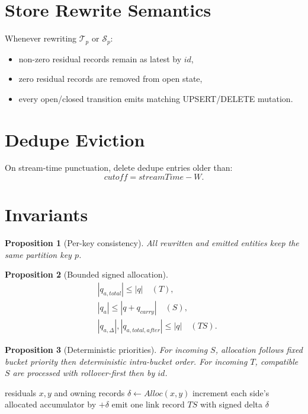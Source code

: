 \documentclass[sigconf]{acmart}
\newtheorem{proposition}{Proposition}
\begin{document}
\section{Store Rewrite Semantics}
Whenever rewriting $\mathcal{T}_p$ or $\mathcal{S}_p$:
\begin{itemize}[leftmargin=*]
  \item non-zero residual records remain as latest by $id$,
  \item zero residual records are removed from open state,
  \item every open/closed transition emits matching UPSERT/DELETE mutation.
\end{itemize}

\section{Dedupe Eviction}
On stream-time punctuation, delete dedupe entries older than:
\[
cutoff=streamTime-W.
\]

\section{Invariants}
\begin{proposition}[Per-key consistency]
All rewritten and emitted entities keep the same partition key $p$.
\end{proposition}

\begin{proposition}[Bounded signed allocation]
\[
\begin{aligned}
&|q_{a,total}|\le |q| \quad (T),\\
&|q_a|\le |q+q_{carry}| \quad (S),\\
&|q_{a,\Delta}|,|q_{a,total,after}|\le |q| \quad (TS).
\end{aligned}
\]
\end{proposition}

\begin{proposition}[Deterministic priorities]
For incoming $S$, allocation follows fixed bucket priority then deterministic intra-bucket order.
For incoming $T$, compatible $S$ are processed with rollover-first then by $id$.
\end{proposition}

\begin{algorithm}[t]
\caption{Signed pair update primitive}
\begin{algorithmic}[1]
\Require residuals $x,y$ and owning records
\State $\delta \gets Alloc(x,y)$
  \State increment each side's allocated accumulator by $+\delta$
  \State emit one link record $TS$ with signed delta $\delta$
\EndIf
\end{algorithmic}
\end{algorithm}
\end{document}
